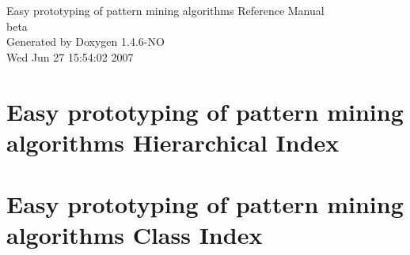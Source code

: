 \documentclass[a4paper]{book}
\begin{document}
\begin{titlepage}
\vspace*{7cm}
\begin{center}
{\Large Easy prototyping of pattern mining algorithms Reference Manual\\[1ex]\large beta }\\
\vspace*{1cm}
{\large Generated by Doxygen 1.4.6-NO}\\
\vspace*{0.5cm}
{\small Wed Jun 27 15:54:02 2007}\\
\end{center}
\end{titlepage}
\clearemptydoublepage
{}
\tableofcontents
\clearemptydoublepage
{}
\chapter{Easy prototyping of pattern mining algorithms Hierarchical Index}

\chapter{Easy prototyping of pattern mining algorithms Class Index}

\end{document}
